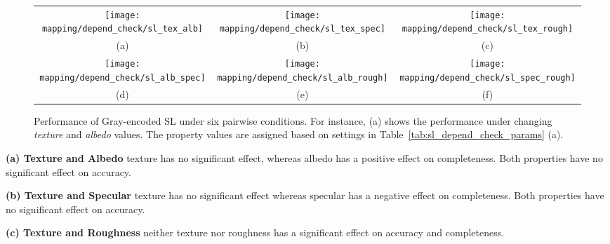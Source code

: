 \begin{sidewaysfigure}[!htbp]
\begin{tabular}{ccc}
\texttt{[image: mapping/depend\_check/sl\_tex\_alb]}&
\texttt{[image: mapping/depend\_check/sl\_tex\_spec]}&
\texttt{[image: mapping/depend\_check/sl\_tex\_rough]}\\
(a) & (b) & (c)\\
\texttt{[image: mapping/depend\_check/sl\_alb\_spec]}&
\texttt{[image: mapping/depend\_check/sl\_alb\_rough]}&
\texttt{[image: mapping/depend\_check/sl\_spec\_rough]}\\
(d) & (e) & (f)\\
\end{tabular}
\caption{Performance of Gray-encoded SL under six pairwise conditions. For instance, (a) shows the performance under changing \textit{texture} and \textit{albedo} values. The property values are assigned based on settings in Table~\ref{tab:sl_depend_check_params} (a).}
\label{fig:sl_depend_check}
\end{sidewaysfigure}

\textbf{(a) Texture and Albedo} 
texture has no significant effect, whereas albedo has a positive effect on completeness. Both properties have no significant effect on accuracy.

\textbf{(b) Texture and Specular} 
texture has no significant effect whereas specular has a negative effect on completeness. Both properties have no significant effect on accuracy.

\textbf{(c) Texture and Roughness} 
neither texture nor roughness has a significant effect on accuracy and completeness.

